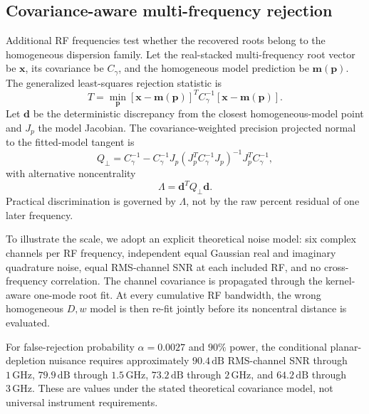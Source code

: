 \documentclass[aps,pra,twocolumn,superscriptaddress,nofootinbib]{revtex4-2}
\begin{document}


\subsection{Covariance-aware multi-frequency rejection}

Additional RF frequencies test whether the recovered roots belong to the homogeneous dispersion family. Let the real-stacked multi-frequency root vector be $\bm x$, its covariance be $C_\gamma$, and the homogeneous model prediction be $\bm m(\bm p)$. The generalized least-squares rejection statistic is
\begin{equation}
\boxed{
T=\min_{\bm p}
[\bm x-\bm m(\bm p)]^T
C_\gamma^{-1}
[\bm x-\bm m(\bm p)].
}
\label{eq:teststat}
\end{equation}
Let $\bm d$ be the deterministic discrepancy from the closest homogeneous-model point and $J_p$ the model Jacobian. The covariance-weighted precision projected normal to the fitted-model tangent is
\begin{equation}
Q_\perp=C_\gamma^{-1}
-C_\gamma^{-1}J_p
(J_p^TC_\gamma^{-1}J_p)^{-1}
J_p^TC_\gamma^{-1},
\end{equation}
with alternative noncentrality
\begin{equation}
\boxed{
\Lambda=\bm d^TQ_\perp\bm d.
}
\label{eq:lambda}
\end{equation}
Practical discrimination is governed by $\Lambda$, not by the raw percent residual of one later frequency.

To illustrate the scale, we adopt an explicit theoretical noise model: six complex channels per RF frequency, independent equal Gaussian real and imaginary quadrature noise, equal RMS-channel SNR at each included RF, and no cross-frequency correlation. The channel covariance is propagated through the kernel-aware one-mode root fit. At every cumulative RF bandwidth, the wrong homogeneous $D,w$ model is then re-fit jointly before its noncentral distance is evaluated.

For false-rejection probability $\alpha=0.0027$ and $90\%$ power, the conditional planar-depletion nuisance requires approximately $90.4\,\mathrm{dB}$ RMS-channel SNR through $1\,\mathrm{GHz}$, $79.9\,\mathrm{dB}$ through $1.5\,\mathrm{GHz}$, $73.2\,\mathrm{dB}$ through $2\,\mathrm{GHz}$, and $64.2\,\mathrm{dB}$ through $3\,\mathrm{GHz}$. These are values under the stated theoretical covariance model, not universal instrument requirements.
\end{document}

